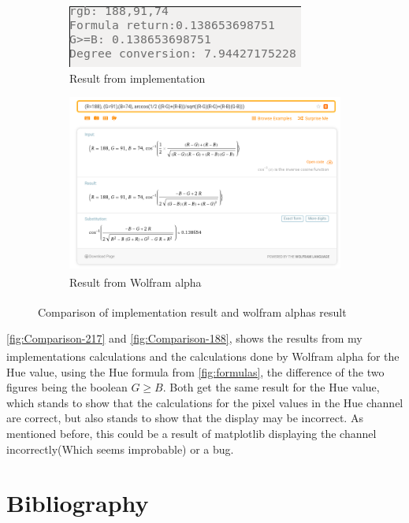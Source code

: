 \documentclass{article}
\newcommand{\goodcite}[1]{\textsuperscript{\cite{#1}}}
\begin{document}
\begin{figure}[H]
\centering
\begin{subfigure}{.5\textwidth}
  \centering
  \includegraphics[width=0.9\linewidth]{img/rgb-188-91-74-code.png}
    \caption{Result from implementation}
  \label{fig:188_code}
\end{subfigure}%
\begin{subfigure}{.5\textwidth} 
  \centering
  \includegraphics[width=0.9\linewidth]{img/rgb-188-91-74-wolfram.png}
    \caption{Result from Wolfram alpha\goodcite{Wolfram}}
  \label{fig:188_wolfram}
\end{subfigure}
    \caption{Comparison of implementation result and wolfram alphas\goodcite{Wolfram} result}
\label{fig:Comparison-188}
\end{figure}

\autoref{fig:Comparison-217} and \autoref{fig:Comparison-188}, shows the results from my implementations calculations and the calculations done by Wolfram alpha\goodcite{Wolfram} for the Hue value, using the Hue formula from \autoref{fig:formulas}, the difference of the two figures being the boolean $G \ge B$. Both get the same result for the Hue value, which stands to show that the calculations for the pixel values in the Hue channel are correct, but also stands to show that the display may be incorrect. As mentioned before, this could be a result of matplotlib displaying the channel incorrectly(Which seems improbable) or a bug.

\newpage
\section{Bibliography}
\printbibliography
\end{document}

